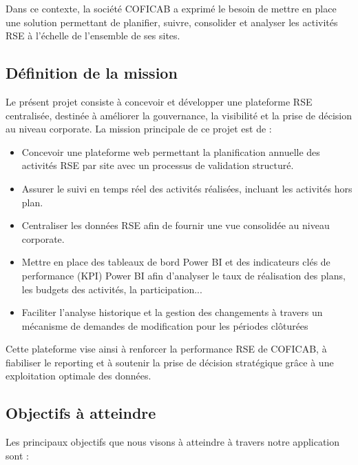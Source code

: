 Dans ce contexte, la société COFICAB a exprimé le besoin de mettre en place une solution permettant de planifier, suivre, consolider et analyser les activités RSE à l’échelle de l’ensemble de ses sites.

\subsection{Définition de la mission}

Le présent projet consiste à concevoir et développer une plateforme RSE centralisée, destinée à améliorer la gouvernance, la visibilité et la prise de décision au niveau corporate. La mission principale de ce projet est de :


\begin{itemize}[label=\textbullet, itemsep=0.15ex, parsep=0pt, topsep=0pt, partopsep=0pt]
  \item Concevoir une plateforme web permettant la planification annuelle des activités RSE par site avec un processus de validation structuré.
  \item Assurer le suivi en temps réel des activités réalisées, incluant les activités hors plan.
  \item Centraliser les données RSE afin de fournir une vue consolidée au niveau corporate.
  \item Mettre en place des tableaux de bord Power BI et des indicateurs clés de performance (KPI) Power BI afin d’analyser le taux de réalisation des plans, les budgets des activités, la participation... 
  \item Faciliter l’analyse historique et la gestion des changements à travers un mécanisme de demandes de modification pour les périodes clôturées
\end{itemize}

Cette plateforme vise ainsi à renforcer la performance RSE de COFICAB, à fiabiliser le reporting et à soutenir la prise de décision stratégique grâce à une exploitation optimale des données.

\subsection{Objectifs à atteindre}

Les principaux objectifs que nous visons à atteindre à travers notre application sont :

